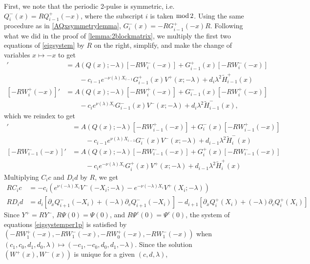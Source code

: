 \documentclass[thesis.tex]{subfiles}
\begin{document}
First, we note that the periodic 2-pulse is symmetric, i.e. $Q_i^-(x) = R Q_{i-1}^+(-x)$, where the subscript $i$ is taken $\mathop\mathrm{mod}\nolimits 2$. Using the same procedure as in \cref{AQxsymmetrylemma}, $G_i^-(x) = -R G_{i-1}^+(-x)R$. Following what we did in the proof of \cref{lemma:2blockmatrix}, we multiply the first two equations of \cref{eigsystem} by $R$ on the right, simplify, and make the change of variables $x \mapsto -x$ to get
\begin{align*}
[-R W_i^-(-x)]' &= A(Q(x); -\lambda)[-R W_i^-(-x)] + G_{i-1}^+(x) [-R W_i^-(-x)] \\
&\qquad -c_{i-1} e^{-\nu(\lambda)X_{i-1}} G_{i-1}^+(x) V^+(x; -\lambda) + d_i \lambda^2 \tilde{H}_{i-1}^+(x) \\
[-R W_i^+(-x)]' &= A(Q(x); -\lambda)[-R W_i^+(-x)] + G_{i-1}^-(x)[-R W_i^+(-x)] \\
&\qquad -c_i e^{\nu(\lambda)X_i } G_{i-1}^-(x)V^-(x; -\lambda) + d_i \lambda^2 \tilde{H}_{i-1}^-(x),
\end{align*}
which we reindex to get
\begin{align*}
[-R W_{i-1}^+(-x)]' &= A(Q(x); -\lambda)[-R W_{i-1}^+(-x)] + G_i^-(x)[-R W_{i-1}^+(-x)] \\
&\qquad - c_{i-1} e^{\nu(\lambda)X_{i-1}} G_i^-(x)V^-(x; -\lambda) + d_{i-1} \lambda^2 \tilde{H}_i^-(x) \\
[-R W_{i-1}^-(-x)]' &= A(Q(x); -\lambda)[-R W_{i-1}^-(-x)] + G_i^+(x) [-R W_{i-1}^-(-x)] \\
&\qquad -c_i e^{-\nu(\lambda)X_i} G_i^+(x) V^+(x; -\lambda) + d_{i-1} \lambda^2 \tilde{H}_i^+(x)
\end{align*}
Multiplying $C_i c$ and $D_i d$ by $R$, we get
\begin{align*}
R C_i c &= -c_i \left( e^{\nu(-\lambda) X_i} V^-(-X_i; -\lambda) - e^{-\nu(-\lambda) X_i} V^+(X_i; -\lambda) \right) \\
R D_i d &= d_i [ \partial_x Q_{i+1}^-(-X_i) + (-\lambda) \partial_c Q_{i+1}^-(-X_i) ] - d_{i+1}[\partial_x Q_i^+(X_i) + (-\lambda) \partial_c Q_i^+(X_i)]
\end{align*}
Since $Y^+ = R Y^-$, $R \Psi(0) = \Psi(0)$, and $R \Psi^c(0) = \Psi^c(0)$, the system of equations \cref{eigsystemper1p} is satisfied by $(-R W_1^+(-x), -R W_1^-(-x), -R W_0^+(-x), -R W_1^-(-x))$ when $(c_1, c_0, d_1, d_0, \lambda) \mapsto (-c_1, -c_0, d_0, d_1, -\lambda)$. Since the solution $(W^+(x), W^-(x))$ is unique for a given $(c, d, \lambda)$, 
\end{document}
